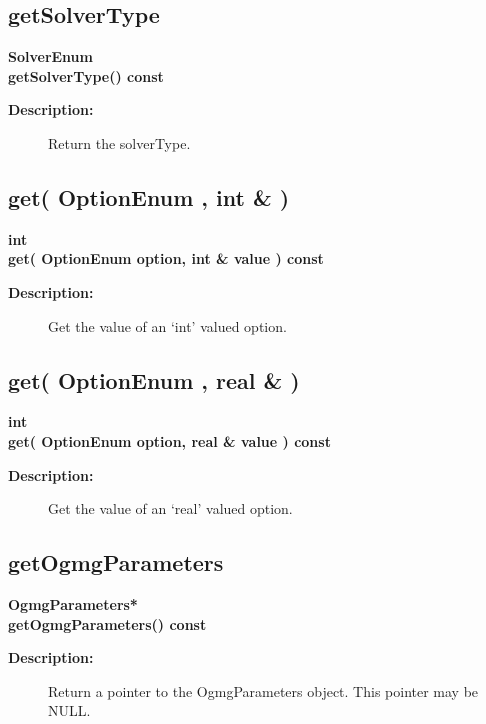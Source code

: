 \subsection{getSolverType}
 
\begin{flushleft} \textbf{%
SolverEnum  \\ 
\settowidth{\OgesParametersIncludeArgIndent}{getSolverType(}%
getSolverType() const
}\end{flushleft}
\begin{description}
\item[{\bf Description:}] 
   Return the solverType.
\end{description}
\subsection{get( OptionEnum , int \& )}
 
\begin{flushleft} \textbf{%
int  \\ 
\settowidth{\OgesParametersIncludeArgIndent}{get(}%
get( OptionEnum option, int \& value ) const
}\end{flushleft}
\begin{description}
\item[{\bf Description:}] 
  Get the value of an `int' valued option.
\end{description}
\subsection{get( OptionEnum , real \&  )}
 
\begin{flushleft} \textbf{%
int  \\ 
\settowidth{\OgesParametersIncludeArgIndent}{get(}%
get( OptionEnum option, real \& value ) const
}\end{flushleft}
\begin{description}
\item[{\bf Description:}] 
  Get the value of an `real' valued option.
\end{description}
\subsection{getOgmgParameters}
 
\begin{flushleft} \textbf{%
OgmgParameters*  \\ 
\settowidth{\OgesParametersIncludeArgIndent}{getOgmgParameters(}%
getOgmgParameters() const
}\end{flushleft}
\begin{description}
\item[{\bf Description:}] 
   Return a pointer to the OgmgParameters object. This pointer may be NULL.
\end{description}
